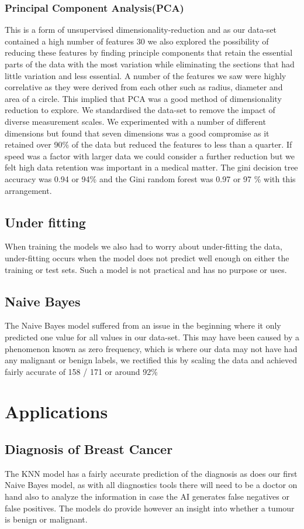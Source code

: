 \documentclass[conference]{IEEEtran}
\begin{document}
\subsubsection{Principal Component Analysis(PCA)} This is a form of unsupervised dimensionality-reduction and as our data-set contained a high number of features 30 we also explored the possibility of reducing these features by finding principle components that retain the essential parts of the data with the most variation while eliminating the sections that had little variation and less essential. A number of the features we saw were highly correlative as they were  derived from each other such as radius, diameter and area of a circle. This implied that PCA was a good method of dimensionality reduction to explore. We standardised the data-set to remove the impact of diverse measurement scales. We experimented with a number of different dimensions but found that seven dimensions was a good compromise as it retained over 90\% of the data but reduced the features to less than a quarter. If speed was a factor with larger data we could consider a further reduction but we felt high data retention was important in a medical matter. The gini decision tree accuracy was 0.94 or 94\% and the Gini random forest was 0.97 or 97 \% with this arrangement.
\subsection{Under fitting}
When training the models we also had to worry about under-fitting the data, under-fitting occurs when the model does not predict well enough on either the training or test sets.  Such a model is not practical and has no purpose or uses.
\subsection{Naive Bayes}
The Naive Bayes model suffered from an issue in the beginning where it only predicted one value for all values in our data-set.  This may have been caused by a phenomenon known as zero frequency, which is where our data may not have had any malignant or benign labels, we rectified this by scaling the data and achieved fairly accurate of 158 / 171 or around 92\%
\section{Applications}
\subsection{Diagnosis of Breast Cancer}
The KNN model has a fairly accurate prediction of the diagnosis as does our first Naive Bayes model, as with all diagnostics tools there will need to be a doctor on hand also to analyze the information in case the AI generates false negatives or false positives.  The models do provide however an insight into whether a tumour is benign or malignant.
\end{document}
